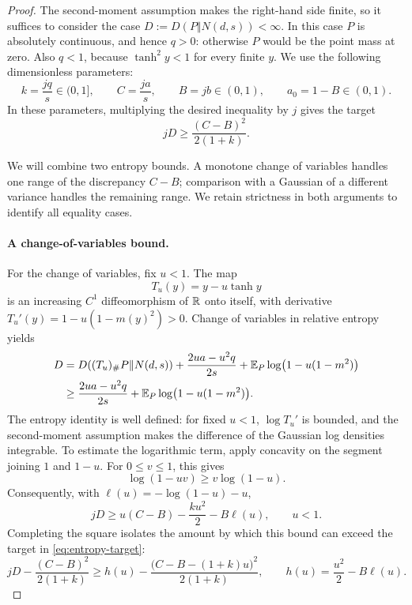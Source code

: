 \begin{proof}
The second-moment assumption makes the right-hand side finite, so
it suffices to consider the case $D:=D(P\Vert N(d,s))<\infty$.  In this case $P$ is
absolutely continuous, and hence $q>0$: otherwise $P$ would be the
point mass at zero.  Also $q<1$, because $\tanh^2 y<1$ for every finite
$y$.  We use the following dimensionless parameters:
\begin{equation}
 k=\frac{jq}{s}\in(0,1],\qquad C=\frac{ja}{s},\qquad
 B=jb\in(0,1),\qquad a_0=1-B\in(0,1).
 \label{eq:entropy-scalars}
\end{equation}
In these parameters, multiplying the desired inequality by $j$
gives the target
\begin{equation}
 jD\ge \frac{(C-B)^2}{2(1+k)}.
 \label{eq:entropy-target}
\end{equation}

We will combine two entropy bounds.  A monotone change of variables
handles one range of the discrepancy $C-B$; comparison with a Gaussian
of a different variance handles the remaining range.  We retain
strictness in both arguments to identify all equality cases.

\paragraph{A change-of-variables bound.}
For the change of variables, fix $u<1$.  The map
\[
 T_u(y)=y-u\tanh y
\]
is an increasing $C^1$ diffeomorphism of $\mathbb R$ onto itself, with derivative
$T_u'(y)=1-u(1-m(y)^2)>0$.  Change of variables in relative entropy yields
\begin{align*}
 D
 &=D((T_u)_\#P\Vert N(d,s))
   +\frac{2ua-u^2q}{2s}
   +\mathbb E_P\log\bigl(1-u(1-m^2)\bigr)\\
 &\ge \frac{2ua-u^2q}{2s}
   +\mathbb E_P\log\bigl(1-u(1-m^2)\bigr).
\end{align*}
The entropy identity is well defined: for fixed $u<1$, $\log T_u'$
is bounded, and the second-moment assumption makes the difference
of the Gaussian log densities integrable.  To estimate the logarithmic
term, apply concavity on the segment joining $1$ and $1-u$.  For
$0\le v\le1$, this gives
\[
 \log(1-uv)\ge v\log(1-u).
\]
Consequently, with $\ell(u)=-\log(1-u)-u$,
\begin{equation}
 jD\ge u(C-B)-\frac{k u^2}{2}-B\ell(u),\qquad u<1.
 \label{eq:entropy-transport}
\end{equation}
Completing the square isolates the amount by which this bound can
exceed the target in \eqref{eq:entropy-target}:
\begin{equation}
 jD-\frac{(C-B)^2}{2(1+k)}
 \ge h(u)-\frac{\bigl(C-B-(1+k)u\bigr)^2}{2(1+k)},
 \qquad h(u)=\frac{u^2}{2}-B\ell(u).
 \label{eq:entropy-slack}
\end{equation}


\end{proof}

